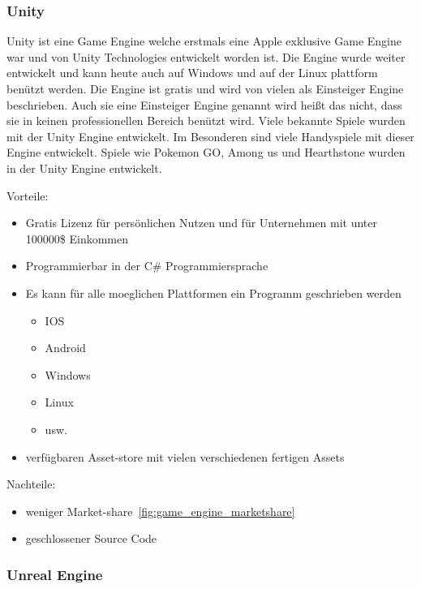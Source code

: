 \subsubsection{Unity}

Unity ist eine Game Engine welche erstmals eine Apple exklusive Game Engine war und von Unity Technologies entwickelt worden ist.
Die Engine wurde weiter entwickelt und kann heute auch auf Windows und auf der Linux plattform benützt werden.
Die Engine ist gratis und wird von vielen als Einsteiger Engine beschrieben.
Auch sie eine Einsteiger Engine genannt wird heißt das nicht, dass sie in keinen professionellen Bereich benützt wird.
Viele bekannte Spiele wurden mit der Unity Engine entwickelt.
Im Besonderen sind viele Handyspiele mit dieser Engine entwickelt.
Spiele wie Pokemon GO, Among us und Hearthstone wurden in der Unity Engine entwickelt.

Vorteile:

\begin{itemize}
    \item Gratis Lizenz für persönlichen Nutzen und für Unternehmen mit unter 100000\$ Einkommen
    \item Programmierbar in der C\# Programmiersprache
    \item Es kann f\"ur alle moeglichen Plattformen ein Programm geschrieben werden
    \begin{itemize}
        \item IOS
        \item Android
        \item Windows
        \item Linux
        \item usw.
    \end{itemize}
    \item verfügbaren Asset-store mit vielen verschiedenen fertigen Assets
\end{itemize}

Nachteile:

\begin{itemize}
    \item weniger Market-share~\ref{fig:game_engine_marketshare}
    \item geschlossener Source Code
\end{itemize}

\subsubsection{Unreal Engine}
\label{sec:unreal_engine}

